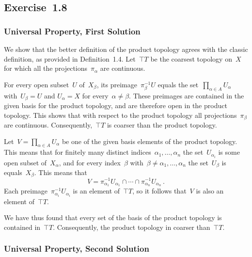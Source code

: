 \subsection{Exercise~1.8}
\label{exercise 1.8}



\subsubsection{Universal Property, First Solution}

We show that the better definition of the product topology agrees with the classic definition, as provided in Definition~1.4.
Let~$\top{T}$ be the coarsest topology on~$X$ for which all the projections~$π_α$ are continuous.

For every open subset~$U$ of~$X_β$, its preimage~$π_β^{-1} U$ equals the set~$∏_{α ∈ A} U_α$ with~$U_β = U$ and $U_α = X$ for every~$α ≠ β$.
These preimages are contained in the given basis for the product topology, and are therefore open in the product topology.
This shows that with respect to the product topology all projections~$π_β$ are continuous.
Consequently,~$\top{T}$ is coarser than the product topology.

Let~$V = ∏_{α ∈ A} U_α$ be one of the given basis elements of the product topology.
This means that for finitely many distinct indices~$α_1, \dotsc, α_n$ the set~$U_{α_i}$ is some open subset of~$X_α$, and for every index~$β$ with~$β ≠ α_1, \dotsc, α_n$ the set~$U_β$ is equals~$X_β$.
This means that
\[
	V = π_{α_1}^{-1} U_{α_1} ∩ \dotsb ∩ π_{α_n}^{-1} U_{α_n} \,.
\]
Each preimage~$π_{α_i}^{-1} U_{α_i}$ is an element of~$\top{T}$, so it follows that~$V$ is also an element of~$\top{T}$.

We have thus found that every set of the basis of the product topology is contained in~$\top{T}$.
Consequently, the product topology in coarser than~$\top{T}$.



\subsubsection{Universal Property, Second Solution}

